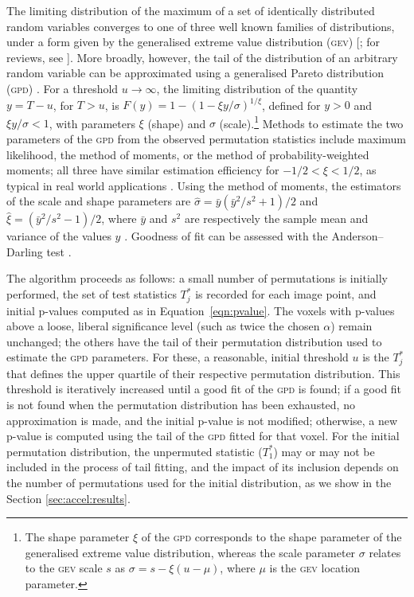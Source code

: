 The limiting distribution of the maximum of a set of identically distributed random variables converges to one of three well known families of distributions, under a form given by the generalised extreme value distribution (\textsc{gev}) [\citet{Gnedenko1943}; for reviews, see \citet{Leadbetter1983, Davison2015}]. More broadly, however, the tail of the distribution of an arbitrary random variable can be approximated using a generalised Pareto distribution (\textsc{gpd}) \citep{PicklandsIII1975}. For a threshold $u\rightarrow\infty$, the limiting distribution of the quantity $y=T-u$, for $T>u$, is $F(y) = 1-(1-\xi y/\sigma)^{1/\xi}$, defined for $y>0$ and $\xi y/\sigma<1$, with parameters $\xi$ (shape) and $\sigma$ (scale).\footnote{The shape parameter $\xi$ of the \textsc{gpd} corresponds to the shape parameter of the generalised extreme value distribution, whereas the scale parameter $\sigma$ relates to the \textsc{gev} scale $s$ as $\sigma=s-\xi(u-\mu)$, where $\mu$ is the \textsc{gev} location parameter.} Methods to estimate the two parameters of the \textsc{gpd} from the observed permutation statistics include maximum likelihood, the method of moments, or the method of probability-weighted moments; all three have similar estimation efficiency for $-1/2 < \xi < 1/2$, as typical in real world applications \citep{Hosking1987, Knijnenburg2009}. Using the method of moments, the estimators of the scale and shape parameters are $\hat{\sigma} = \bar{y}(\bar{y}^2/s^2+1)/2$ and $\hat{\xi}=(\bar{y}^2/s^2-1)/2$, where $\bar{y}$ and $s^2$ are respectively the sample mean and variance of the values $y$ \citep{Hosking1987}. Goodness of fit can be assessed with the Anderson--Darling test \citep{Anderson1952, Choulakian2001, Knijnenburg2009}.

The algorithm proceeds as follows: a small number of permutations is initially performed, the set of test statistics $T^*_j$ is recorded for each image point, and initial p-values computed as in Equation~\ref{eqn:pvalue}. The voxels with p-values above a loose, liberal significance level (such as twice the chosen $\alpha$) remain unchanged; the others have the tail of their permutation distribution used to estimate the \textsc{gpd} parameters. For these, a reasonable, initial threshold $u$ is the $T^*_j$ that defines the upper quartile of their respective permutation distribution. This threshold is iteratively increased until a good fit of the \textsc{gpd} is found; if a good fit is not found when the permutation distribution has been exhausted, no approximation is made, and the initial p-value is not modified; otherwise, a new p-value is computed using the tail of the \textsc{gpd} fitted for that voxel. For the initial permutation distribution, the unpermuted statistic ($T^*_1$) may or may not be included in the process of tail fitting, and the impact of its inclusion depends on the number of permutations used for the initial distribution, as we show in the Section \ref{sec:accel:results}.

